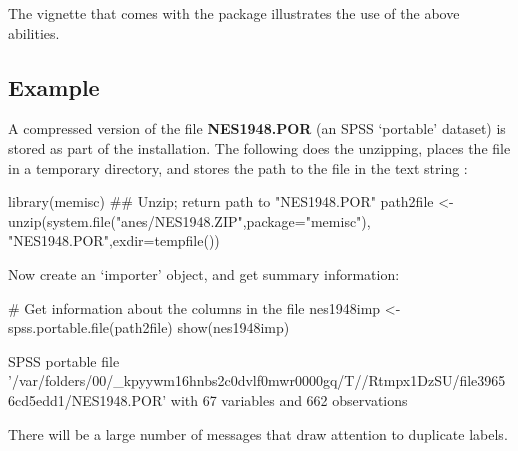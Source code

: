 The vignette  that comes with the  package
illustrates the use of the above abilities.

\subsection*{Example}

A compressed version of the file \textbf{NES1948.POR} (an SPSS `portable' dataset)
is stored as part of the  installation.  The following
does the unzipping, places the file in a temporary directory,
and stores the path to the file in the text string :
\begin{fullwidth}

\begin{Schunk}
\begin{Sinput}
library(memisc)
## Unzip; return path to "NES1948.POR"
path2file <- unzip(system.file("anes/NES1948.ZIP",package="memisc"),
                     "NES1948.POR",exdir=tempfile())
\end{Sinput}
\end{Schunk}

\end{fullwidth}

Now create an `importer' object, and get summary information:
\begin{fullwidth}
\begin{Schunk}
\begin{Sinput}
# Get information about the columns in the file
nes1948imp <- spss.portable.file(path2file)
show(nes1948imp)
\end{Sinput}
\end{Schunk}
\footnotesize
\begin{Schunk}
\begin{Soutput}

SPSS portable file '/var/folders/00/_kpyywm16hnbs2c0dvlf0mwr0000gq/T//Rtmpx1DzSU/file39656cd5edd1/NES1948.POR' 
	with 67 variables and 662 observations
\end{Soutput}
\end{Schunk}
\end{fullwidth}
There will be a large number of messages that draw attention to
duplicate labels.

